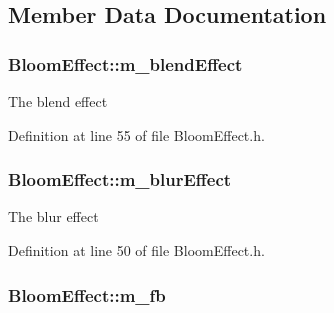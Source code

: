 \subsection{Member Data Documentation}
\subsubsection[{\texorpdfstring{m\+\_\+blend\+Effect}{m_blendEffect}}]{ Bloom\+Effect\+::m\+\_\+blend\+Effect\hspace{0.3cm}{\ttfamily [private]}}\hypertarget{class_bloom_effect_a2227e1cb8bf17f584ef22b8320d4bf01}{}\label{class_bloom_effect_a2227e1cb8bf17f584ef22b8320d4bf01}


The blend effect 



Definition at line 55 of file Bloom\+Effect.\+h.

\subsubsection[{\texorpdfstring{m\+\_\+blur\+Effect}{m_blurEffect}}]{ Bloom\+Effect\+::m\+\_\+blur\+Effect\hspace{0.3cm}{\ttfamily [private]}}\hypertarget{class_bloom_effect_abc532338b21e4a70dac9a4e98bff00ae}{}\label{class_bloom_effect_abc532338b21e4a70dac9a4e98bff00ae}


The blur effect 



Definition at line 50 of file Bloom\+Effect.\+h.

\subsubsection[{\texorpdfstring{m\+\_\+fb}{m_fb}}]{ Bloom\+Effect\+::m\+\_\+fb\hspace{0.3cm}{\ttfamily [private]}}\hypertarget{class_bloom_effect_a6e92b45d7d260f5aa0dcf3a299b28cfe}{}\label{class_bloom_effect_a6e92b45d7d260f5aa0dcf3a299b28cfe}



